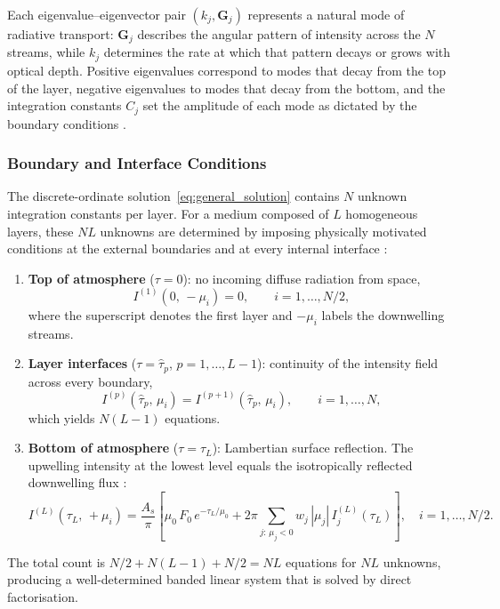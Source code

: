 \documentclass[a4paper, 11pt]{article}
\begin{document}
Each eigenvalue--eigenvector pair $(k_j, \mathbf{G}_j)$ represents a
natural mode of radiative transport: $\mathbf{G}_j$ describes the
angular pattern of intensity across the $N$ streams, while $k_j$
determines the rate at which that pattern decays or grows with optical
depth.  Positive eigenvalues correspond to modes that decay from the
top of the layer, negative eigenvalues to modes that decay from the
bottom, and the integration constants $C_j$ set the amplitude of each
mode as dictated by the boundary conditions \cite{disortreport}.

\subsubsection{Boundary and Interface Conditions}

The discrete-ordinate solution~\eqref{eq:general_solution} contains $N$
unknown integration constants per layer.  For a medium composed of $L$
homogeneous layers, these $NL$ unknowns are determined by imposing
physically motivated conditions at the external boundaries and at every
internal interface \cite{disortreport,stamnes1984}:
%
\begin{enumerate}[label=(\roman*)]
  \item \textbf{Top of atmosphere} ($\tau = 0$): no incoming diffuse
        radiation from space,
        \begin{equation}
          I^{(1)}(0,\,-\mu_i) = 0,
          \qquad i = 1,\ldots,N/2,
          \label{eq:bc_toa}
        \end{equation}
        where the superscript denotes the first layer and $-\mu_i$
        labels the downwelling streams.

  \item \textbf{Layer interfaces} ($\tau = \hat{\tau}_p$,
        $p = 1,\ldots,L{-}1$): continuity of the intensity field
        across every boundary,
        \begin{equation}
          I^{(p)}(\hat{\tau}_p,\,\mu_i)
          = I^{(p+1)}(\hat{\tau}_p,\,\mu_i),
          \qquad i = 1,\ldots,N,
          \label{eq:bc_interface}
        \end{equation}
        which yields $N(L-1)$ equations.

  \item \textbf{Bottom of atmosphere} ($\tau = \tau_L$): Lambertian
        surface reflection.  The upwelling intensity at the lowest level
        equals the isotropically reflected downwelling flux
        \cite{disortreport}:
        \begin{equation}
          I^{(L)}(\tau_L,\,+\mu_i)
          = \frac{A_s}{\pi}\left[
            \mu_0\,F_0\,e^{-\tau_L/\mu_0}
            + 2\pi\!\sum_{j:\,\mu_j<0}w_j\,|\mu_j|\,
              I_j^{(L)}(\tau_L)\right],
          \quad i = 1,\ldots,N/2.
          \label{eq:bc_boa}
        \end{equation}
\end{enumerate}
%
The total count is $N/2 + N(L{-}1) + N/2 = NL$ equations for $NL$
unknowns, producing a well-determined banded linear system that is
solved by direct factorisation.
\end{document}
